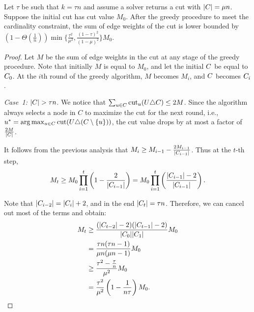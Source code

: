 \begin{lemma}
	\label{lem:cut-blackbox-deduction}
	Let $\tau$ be such that $k = \tau n$ and assume a \maxcut solver returns a
	cut with $\lvert C\rvert = \mu n$. Suppose the initial cut has cut value $M_0$.
	After the greedy procedure to meet the cardinality constraint, the sum of edge weights of the cut is lower bounded by $(1 - \Theta(\frac{1}{n}))\min \{\frac{\tau^2}{\mu^2}, \frac{(1-\tau)^2}{(1-\mu)^2}\} M_0$. 
\end{lemma}

\begin{proof}
	Let $M$ be the sum of edge weights in the cut at any stage of the greedy
	procedure. Note that initially $M$ is equal to $M_0$, and let the initial
	$C$ be equal to $C_0$. At the $i$th round of the greedy
	algorithm, $M$ becomes $M_i$, and $C$ becomes $C_i$. 
	
\emph{Case~1:} $\lvert C\rvert > \tau n$.
	We notice that $\sum_{u\in C} \mathrm{cut}_{u}\!\left(U \triangle C\right) \leq  2M$. 
Since the algorithm always selects a node in $C$ to maximize the cut for the
next round, i.e., $u^* = \arg \max_{u \in \SelectSet} \cut{\OldSet \symm (\SelectSet \setminus \{u\})}$,
the cut value drops by at most a factor of $\frac{2M}{\lvert C\rvert}$. 


It follows from the previous analysis that $M_i \geq M_{i-1} - \frac{2M_{i-1}}{\lvert C_{i-1}\rvert}$. 
Thus at the $t$-th step, 
\begin{displaymath}
	M_t \geq M_0 \prod_{i=1}^t \left(1 - \frac{2}{\lvert C_{i-1}\rvert}\right)
	= M_0 \prod_{i=1}^t \left(\frac{\lvert C_{i-1}\rvert - 2}{\lvert C_{i-1}\rvert}\right).
\end{displaymath}

Note that $\lvert C_{i -2}\rvert = \lvert C_{i}\rvert + 2$, and in the end
$|C_t| = \tau n$. Therefore, we can cancel out most of the terms and
obtain:
\begin{displaymath}
	\begin{aligned}
		M_{t} &\geq \frac{(\lvert C_{t-2}\rvert-2)(\lvert C_{t-1}\rvert-2)}{\lvert C_0\rvert\lvert C_1\rvert}M_{0} \\
		&= \frac{\tau n(\tau n - 1)}{\mu n (\mu n - 1)}M_{0} \\
		&\geq \frac{\tau^2 - \frac{\tau}{n}}{\mu^2} M_0 \\
		&= \frac{\tau^2}{\mu^2}\left(1 - \frac{1}{n\tau}\right) M_0.
	\end{aligned}
\end{displaymath}



\end{proof}
